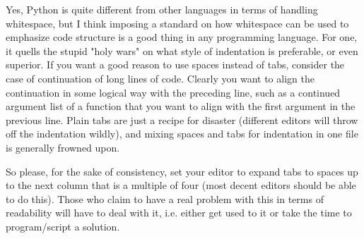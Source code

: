 \documentclass[12pt]{article}
\begin{document}
Yes, Python is quite different from other languages in terms of handling whitespace, but I think imposing a standard on how whitespace can be used to emphasize code structure is a good thing in any programming language. For one, it quells the stupid "holy wars" on what style of indentation is preferable, or even superior. If you want a good reason to use spaces instead of tabs, consider the case of continuation of long lines of code. Clearly you want to align the continuation in some logical way with the preceding line, such as a continued argument list of a function that you want to align with the first argument in the previous line. Plain tabs are just a recipe for disaster (different editors will throw off the indentation wildly), and mixing spaces and tabs for indentation in one file is generally frowned upon.

So please, for the sake of consistency, set your editor to expand tabs to spaces up to the next column that is a multiple of four (most decent editors should be able to do this). Those who claim to have a real problem with this in terms of readability will have to deal with it, i.e. either get used to it or take the time to program/script a solution.
\end{document}
